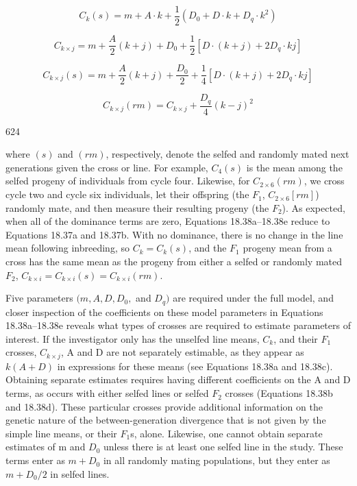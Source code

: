 \documentclass{article}
\begin{document}
\begin{equation}
C_{k}(s)=m+A\cdot k+\frac{1}{2}\left(D_{0}+D\cdot k+D_{q}\cdot k^{2}\right)
\tag{18.38b}
\label{eq:18_38b}
\end{equation}

\begin{equation}
C_{k\times j}=m+\frac{A}{2}(k+j)+D_{0}+\frac{1}{2}\left[D\cdot(k+j)+2D_{q}\cdot k j\right]
\tag{18.38c}
\label{eq:18_38c}
\end{equation}

\begin{equation}
C_{k\times j}(s)=m+\frac{A}{2}(k+j)+\frac{D_{0}}{2}+\frac{1}{4}\left[D\cdot(k+j)+2D_{q}\cdot k j\right]
\tag{18.38d}
\label{eq:18_38d}
\end{equation}

\begin{equation}
C_{k\times j}(rm)=C_{k\times j}+\frac{D_{q}}{4}(k-j)^{2}
\tag{18.38e}
\label{eq:18_38e}
\end{equation}

624

where  $ (s) $ and  $ (rm) $, respectively, denote the selfed and randomly mated next generations given the cross or line. For example,  $ C_4(s) $ is the mean among the selfed progeny of individuals from cycle four. Likewise, for  $ C_{2\times6}(rm) $, we cross cycle two and cycle six individuals, let their offspring (the  $ F_1 $,  $ C_{2\times6}[rm] $) randomly mate, and then measure their resulting progeny (the  $ F_2 $). As expected, when all of the dominance terms are zero, Equations 18.38a–18.38e reduce to Equations 18.37a and 18.37b. With no dominance, there is no change in the line mean following inbreeding, so  $ C_k = C_k(s) $, and the  $ F_1 $ progeny mean from a cross has the same mean as the progeny from either a selfed or randomly mated  $ F_2 $,  $ C_{k\times i} = C_{k\times i}(s) = C_{k\times i}(rm) $.

Five parameters  $ (m, A, D, D_0, $ and  $ D_q) $ are required under the full model, and closer inspection of the coefficients on these model parameters in Equations 18.38a–18.38e reveals what types of crosses are required to estimate parameters of interest. If the investigator only has the unselfed line means,  $ C_k $, and their  $ F_1 $ crosses,  $ C_{k \times j} $, A and D are not separately estimable, as they appear as  $ k(A + D) $ in expressions for these means (see Equations 18.38a and 18.38c). Obtaining separate estimates requires having different coefficients on the A and D terms, as occurs with either selfed lines or selfed  $ F_2 $ crosses (Equations 18.38b and 18.38d). These particular crosses provide additional information on the genetic nature of the between-generation divergence that is not given by the simple line means, or their  $ F_1 $s, alone. Likewise, one cannot obtain separate estimates of m and  $ D_0 $ unless there is at least one selfed line in the study. These terms enter as  $ m + D_0 $ in all randomly mating populations, but they enter as  $ m + D_0 / 2 $ in selfed lines.
\end{document}
